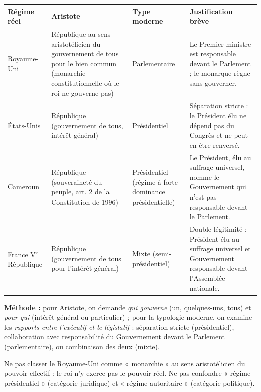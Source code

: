 \documentclass[11pt]{article}
\begin{document}
\begin{corrige}
\begin{center}
\begin{tabularx}{\linewidth}{|l|X|X|X|}\hline
\textbf{Régime réel} & \textbf{Aristote} & \textbf{Type moderne} & \textbf{Justification brève} \\ \hline
Royaume-Uni & République au sens aristotélicien du gouvernement de tous pour le bien commun (monarchie constitutionnelle où le roi ne gouverne pas) & Parlementaire & Le Premier ministre est responsable devant le Parlement ; le monarque règne sans gouverner. \\ \hline
États-Unis & République (gouvernement de tous, intérêt général) & Présidentiel & Séparation stricte : le Président élu ne dépend pas du Congrès et ne peut en être renversé. \\ \hline
Cameroun & République (souveraineté du peuple, art. 2 de la Constitution de 1996) & Présidentiel (régime à forte dominance présidentielle) & Le Président, élu au suffrage universel, nomme le Gouvernement qui n'est pas responsable devant le Parlement. \\ \hline
France V\textsuperscript{e} République & République (gouvernement de tous pour l'intérêt général) & Mixte (semi-présidentiel) & Double légitimité : Président élu au suffrage universel et Gouvernement responsable devant l'Assemblée nationale. \\ \hline
\end{tabularx}
\end{center}

\textbf{Méthode :} pour Aristote, on demande \emph{qui gouverne} (un, quelques-uns, tous) et \emph{pour qui} (intérêt général ou particulier) ; pour la typologie moderne, on examine les \emph{rapports entre l'exécutif et le législatif} : séparation stricte (présidentiel), collaboration avec responsabilité du Gouvernement devant le Parlement (parlementaire), ou combinaison des deux (mixte).
\end{corrige}

\begin{attention}
Ne pas classer le Royaume-Uni comme « monarchie » au sens aristotélicien du pouvoir effectif : le roi n'y exerce pas le pouvoir réel. Ne pas confondre « régime présidentiel » (catégorie juridique) et « régime autoritaire » (catégorie politique).
\end{attention}
\end{document}
